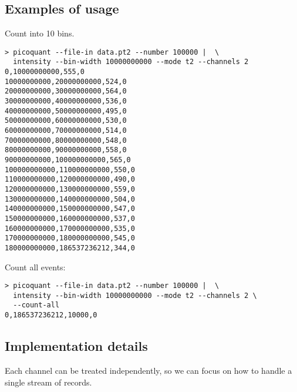 \documentclass{article}
\begin{document}
\subsection{Examples of usage}
Count into 10\milli\second{} bins.
\begin{verbatim}
> picoquant --file-in data.pt2 --number 100000 |  \
  intensity --bin-width 10000000000 --mode t2 --channels 2 
0,10000000000,555,0
10000000000,20000000000,524,0
20000000000,30000000000,564,0
30000000000,40000000000,536,0
40000000000,50000000000,495,0
50000000000,60000000000,530,0
60000000000,70000000000,514,0
70000000000,80000000000,548,0
80000000000,90000000000,558,0
90000000000,100000000000,565,0
100000000000,110000000000,550,0
110000000000,120000000000,490,0
120000000000,130000000000,559,0
130000000000,140000000000,504,0
140000000000,150000000000,547,0
150000000000,160000000000,537,0
160000000000,170000000000,535,0
170000000000,180000000000,545,0
180000000000,186537236212,344,0
\end{verbatim}
Count all events:
\begin{verbatim}
> picoquant --file-in data.pt2 --number 100000 |  \
  intensity --bin-width 10000000000 --mode t2 --channels 2 \
  --count-all
0,186537236212,10000,0
\end{verbatim}

\subsection{Implementation details}
\label{sec:intensity_implementation}
Each channel can be treated independently, so we can focus on how to handle a single stream of records. 
\end{document}
